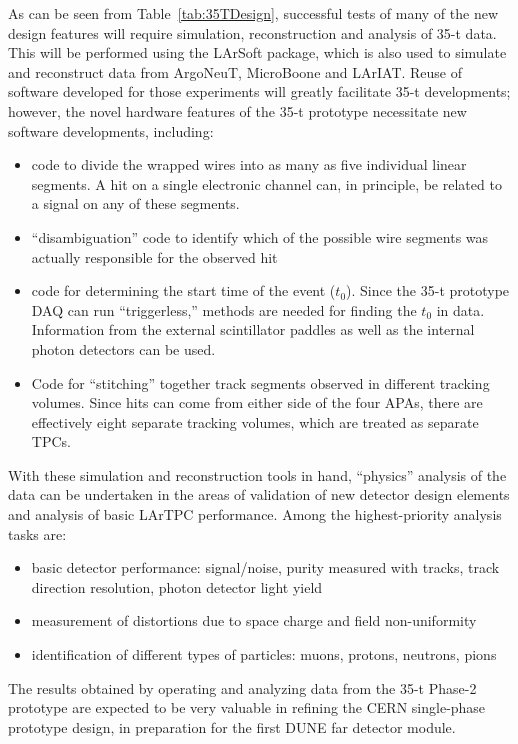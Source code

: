 As can be seen from Table~\ref{tab:35TDesign}, successful tests of many of the new
design features will require simulation, reconstruction and analysis of 35-t data.
This will be performed using the LArSoft package, which is also used to simulate and
reconstruct data from ArgoNeuT, MicroBoone and LArIAT.
Reuse of software developed for those experiments will greatly facilitate 35-t developments;
however, the novel hardware features of the 35-t prototype necessitate new software developments, including:
\begin{itemize}
\item{code to divide the wrapped wires into as many as five individual linear segments.
A hit on a single electronic channel can, in principle, be related to a
signal on any of these segments.}
\item{``disambiguation'' code to identify which of the possible wire segments was actually responsible
for the observed hit}
\item{code for determining the start time of the event ($t_0$). Since the 35-t prototype DAQ can
run ``triggerless,'' methods are needed for finding the $t_0$ in data. Information from the external
scintillator paddles as well as the internal photon detectors can be used.}
\item{Code for ``stitching'' together track segments observed in different tracking volumes.
Since hits can come from either side of the four APAs, there are
effectively eight separate tracking volumes,
which are treated as separate TPCs.}
\end{itemize}

With these simulation and reconstruction tools in hand, ``physics''
analysis of the data can be undertaken in the areas of validation of
new detector design elements and analysis of basic LArTPC performance.
Among the highest-priority analysis tasks are:
\begin{itemize}
\item{basic detector performance: signal/noise, purity measured with tracks, track direction resolution,
photon detector light yield}
\item{measurement of distortions due to space charge and field non-uniformity}
\item{identification of different types of particles: muons, protons, neutrons, pions}
\end{itemize}

The results obtained by operating and analyzing data from the 35-t
Phase-2 prototype are expected to be very valuable in refining the
CERN single-phase prototype design, in preparation for the first
 DUNE far detector module.

